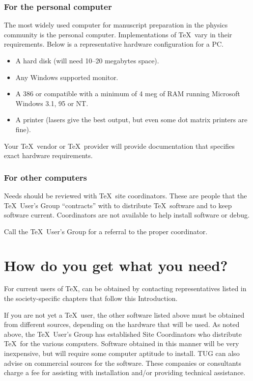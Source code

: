 \subsubsection{For the personal computer}

The most widely used computer for manuscript preparation in the physics
community is the personal computer. Implementations of \TeX\ vary in
their requirements.   Below is a representative hardware configuration
for a PC.

\begin{itemize}
\item A hard disk (will need 10--20 megabytes space).

\item Any Windows supported monitor.

\item A 386 or compatible with a minimum of 4 meg of RAM running
Microsoft Windows 3.1, 95 or NT. 

\item A printer (lasers give the best output, but even some dot matrix
printers are fine).
\end{itemize}

Your \TeX\ vendor or \TeX\ provider will provide documentation
that specifies exact hardware requirements.

\subsubsection{For other computers}

Needs should be reviewed with \TeX\ site coordinators.  These
are people that the \TeX\ User's Group ``contracts'' with to distribute
\TeX\ software and to keep software current. Coordinators are not
available to help install software or debug.

Call the \TeX\ User's Group for a referral to the proper coordinator.

\section{How do you get what you need?}

For current users of \TeX , \REVTeX{} can be obtained by contacting
representatives listed in the society-specific chapters that
follow this Introduction.

If you are not yet a \TeX\ user, the other software listed above must be
obtained from different sources, depending on the hardware that will be
used. As noted above, the \TeX\ User's Group has established Site
Coordinators who distribute \TeX\ for the various computers.  Software
obtained in this manner will be very inexpensive, but will require some
computer aptitude to install.  TUG can also advise on commercial sources
for the software. These companies or consultants charge a fee for assisting
with installation and/or providing technical assistance.

